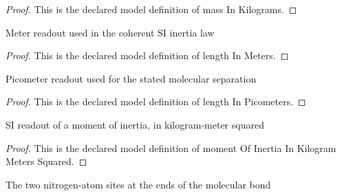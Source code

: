 \begin{proof}
  This is the declared model definition of mass In Kilograms.
\end{proof}
\begin{definition}
  \label{def:physics:phyx-mini-0335:phyxminiproblems-problemphyxmini0335-lengthinmeters}
  Meter readout used in the coherent SI inertia law
\end{definition}
\begin{proof}
  This is the declared model definition of length In Meters.
\end{proof}
\begin{definition}
  \label{def:physics:phyx-mini-0335:phyxminiproblems-problemphyxmini0335-lengthinpicometers}
  Picometer readout used for the stated molecular separation
\end{definition}
\begin{proof}
  This is the declared model definition of length In Picometers.
\end{proof}
\begin{definition}
  \label{def:physics:phyx-mini-0335:phyxminiproblems-problemphyxmini0335-momentofinertiainkilogrammeterssquared}
  SI readout of a moment of inertia, in kilogram-meter squared
\end{definition}
\begin{proof}
  This is the declared model definition of moment Of Inertia In Kilogram Meters Squared.
\end{proof}
\begin{definition}
  \label{def:physics:phyx-mini-0335:phyxminiproblems-problemphyxmini0335-atomsite}
  The two nitrogen-atom sites at the ends of the molecular bond
\end{definition}
